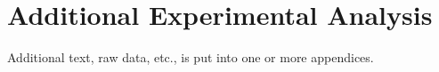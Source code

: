 \chapter{Additional Experimental Analysis}


Additional text, raw data, etc., is put into one or more appendices.
